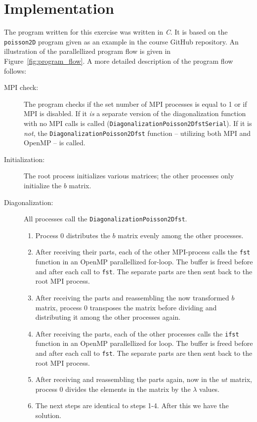 
\section{Implementation} %
\label{sec:implementation}
The program written for this exercise was written in \emph{C}. It is based on the \texttt{poisson2D} program given as an example in the course GitHub repository. An illustration of the parallellized program flow is given in Figure~\ref{fig:program_flow}. A more detailed description of the program flow follows:
\begin{description}
  \item [MPI check:] The program checks if the set number of MPI processes is equal to 1 or if MPI is disabled. If it \emph{is} a separate version of the diagonalization function with no MPI calls is called (\texttt{DiagonalizationPoisson2DfstSerial}). If it is \emph{not}, the \texttt{DiagonalizationPoisson2Dfst} function -- utilizing both MPI and OpenMP -- is called.
  \item [Initialization:] The root process initializes various matrices; the other processes only initialize the $b$ matrix.
  \item [Diagonalization:] All processes call the \texttt{DiagonalizationPoisson2Dfst}.
  \begin{enumerate}
    \item Process 0 distributes the $b$ matrix evenly among the other processes.
    \item After receiving their parts, each of the other MPI-process calls the \texttt{fst} function in an OpenMP parallellized for-loop. The buffer is freed before and after each call to \texttt{fst}. The separate parts are then sent back to the root MPI process.
    \item After receiving the parts and reassembling the now transformed $b$ matrix, process 0 transposes the matrix before dividing and distributing it among the other processes again.
    \item After receiving the parts, each of the other processes calls the \texttt{ifst} function in an OpenMP parallellized for loop. The buffer is freed before and after each call to \texttt{fst}. The separate parts are then sent back to the root MPI process.
    \item After receiving and reassembling the parts again, now in the $ut$ matrix, process 0 divides the elements in the matrix by the $\lambda$ values.
    \item The next steps are identical to steps 1-4. After this we have the solution.
  \end{enumerate}
\end{description}

